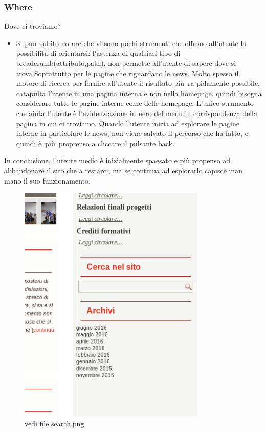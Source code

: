 \documentclass[12pt]{article}
\begin{document}
\subsubsection{Where} Dove ci troviamo?
\begin{itemize}
	\item Si pu\`o\ subito notare che vi sono pochi strumenti che offrono all'utente la possibilit\`a di orientarsi:
	l'assenza di qualsiasi tipo di breadcrumb(attributo,path), non permette all'utente
	di sapere dove si trova.Soprattutto per le pagine che riguardano le news. Molto spesso il motore di ricerca per fornire all'utente il risultato pi\`u\ ra pidamente possibile, catapulta l'utente in una pagina interna e non nella homepage. quindi bisogna considerare tutte le pagine interne come delle homepage.
	L'unico strumento che aiuta l'utente \`e l'evidenziazione in nero del menu in corrispondenza della pagina in cui ci troviamo.
	Quando l'utente inizia ad esplorare le pagine interne in particolare le news, non viene salvato il percorso che ha fatto, e quindi \`e\ pi\`u\ proprenso a cliccare il pulsante back.
\end{itemize}
In conclusione, l'utente medio \`e inizialmente spaesato e pi\`u propenso ad abbandonare il sito che a restarci, ma se continua ad esplorarlo capisce man mano il suo funzionamento.

\begin{figure}[ht!]
\centering
\includegraphics[width=90mm]{search}
\caption{vedi file search.png}
\end{figure} 
\end{document}

